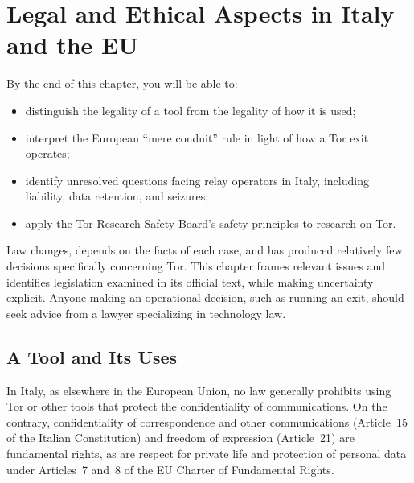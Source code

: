 \chapter{Legal and Ethical Aspects in Italy and the EU}\label{cap:25-legale}

\begin{obiettivi}
By the end of this chapter, you will be able to:
\begin{itemize}[nosep]
  \item distinguish the legality of a tool from the legality of how it is used;
  \item interpret the European \enquote{mere conduit} rule in light of how a Tor exit operates;
  \item identify unresolved questions facing relay operators in Italy, including liability, data retention, and seizures;
  \item apply the Tor Research Safety Board's safety principles to research on Tor.
\end{itemize}
\end{obiettivi}

\begin{attenzione}
Law changes, depends on the facts of each case, and has produced relatively few decisions specifically concerning Tor. This chapter frames relevant issues and identifies legislation examined in its official text, while making uncertainty explicit. Anyone making an operational decision, such as running an exit, should seek advice from a lawyer specializing in technology law.
\end{attenzione}

\section{A Tool and Its Uses}\label{sec:legale-strumento}

In Italy, as elsewhere in the European Union, no law generally prohibits using Tor or other tools that protect the confidentiality of communications. On the contrary, confidentiality of correspondence and other communications (Article~15 of the Italian Constitution) and freedom of expression (Article~21) are fundamental rights, as are respect for private life and protection of personal data under Articles~7 and~8 of the EU Charter of Fundamental Rights.

